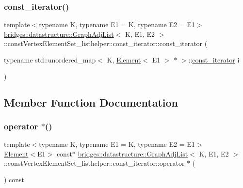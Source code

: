 \subsubsection{\texorpdfstring{const\_iterator()}{const\_iterator()}}
{\footnotesize\ttfamily template$<$typename K, typename E1 = K, typename E2 = E1$>$ \\
\mbox{\hyperlink{classbridges_1_1datastructure_1_1_graph_adj_list}{bridges\+::datastructure\+::\+Graph\+Adj\+List}}$<$ K, E1, E2 $>$\+::const\+Vertex\+Element\+Set\+\_\+listhelper\+::const\+\_\+iterator\+::const\+\_\+iterator (\begin{DoxyParamCaption}\item[{typename std\+::unordered\+\_\+map$<$ K, \mbox{\hyperlink{classbridges_1_1datastructure_1_1_element}{Element}}$<$ E1 $>$ $\ast$ $>$\+::\mbox{\hyperlink{classbridges_1_1datastructure_1_1_graph_adj_list_1_1const_vertex_element_set__listhelper_1_1const__iterator}{const\+\_\+iterator}}}]{i }\end{DoxyParamCaption})\hspace{0.3cm}{\ttfamily [inline]}}



\subsection{Member Function Documentation}
\mbox{\label{classbridges_1_1datastructure_1_1_graph_adj_list_1_1const_vertex_element_set__listhelper_1_1const__iterator_a05e1a0e34fba417f146f3b5366e2ec90}} 
\subsubsection{\texorpdfstring{operator $\ast$()}{operator *()}}
{\footnotesize\ttfamily template$<$typename K, typename E1 = K, typename E2 = E1$>$ \\
\mbox{\hyperlink{classbridges_1_1datastructure_1_1_element}{Element}}$<$E1$>$ const$\ast$ \mbox{\hyperlink{classbridges_1_1datastructure_1_1_graph_adj_list}{bridges\+::datastructure\+::\+Graph\+Adj\+List}}$<$ K, E1, E2 $>$\+::const\+Vertex\+Element\+Set\+\_\+listhelper\+::const\+\_\+iterator\+::operator $\ast$ (\begin{DoxyParamCaption}{ }\end{DoxyParamCaption}) const\hspace{0.3cm}{\ttfamily [inline]}}

